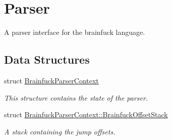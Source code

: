 \hypertarget{group__parser}{}\section{Parser}
\label{group__parser}


A parser interface for the brainfuck language.  


\subsection*{Data Structures}
\begin{DoxyCompactItemize}
\item 
struct \hyperlink{structBrainfuckParserContext}{Brainfuck\+Parser\+Context}
\begin{DoxyCompactList}\small\item\em This structure contains the state of the parser. \end{DoxyCompactList}\item 
struct \hyperlink{structBrainfuckParserContext_1_1BrainfuckOffsetStack}{Brainfuck\+Parser\+Context\+::\+Brainfuck\+Offset\+Stack}
\begin{DoxyCompactList}\small\item\em A stack containing the jump offsets. \end{DoxyCompactList}\end{DoxyCompactItemize}
